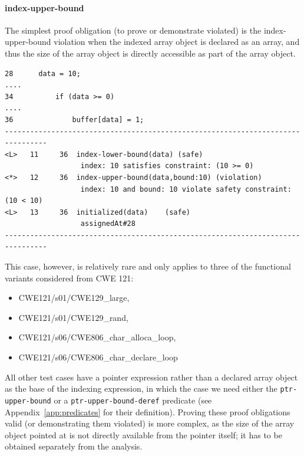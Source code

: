 \documentclass[11pt]{article}
\begin{document}
\paragraph{index-upper-bound}
The simplest proof obligation (to prove or demonstrate violated) is the
index-upper-bound violation when the
indexed array object is declared as an array, and thus the size of the
array object is directly accessible as part of the array object.
\begin{small}
\begin{verbatim}
28      data = 10;
....
34          if (data >= 0)
....
36              buffer[data] = 1;
--------------------------------------------------------------------------------
<L>   11     36  index-lower-bound(data) (safe)
                  index: 10 satisfies constraint: (10 >= 0)
<*>   12     36  index-upper-bound(data,bound:10) (violation)
                  index: 10 and bound: 10 violate safety constraint: (10 < 10)
<L>   13     36  initialized(data)    (safe)
                  assignedAt#28
--------------------------------------------------------------------------------
\end{verbatim}
\end{small}
This case, however, is relatively rare and only applies to three of the 
functional variants considered from  CWE 121:
\begin{itemize}
\item CWE121/s01/CWE129\_large,
\item CWE121/s01/CWE129\_rand,
\item CWE121/s06/CWE806\_char\_alloca\_loop,
\item CWE121/s06/CWE806\_char\_declare\_loop
\end{itemize}

All other test cases have a pointer expression rather than a declared array
object as the base of the indexing expression, in which the case we need
either the {\tt ptr-upper-bound} or a {\tt ptr-upper-bound-deref} predicate
(see Appendix~\ref{app:predicates} for their definition). Proving these
proof obligations valid (or demonstrating them violated) is more complex, as
the size of the array object pointed at is not directly available from  the
pointer itself; it has to be obtained separately from the analysis.
\end{document}
